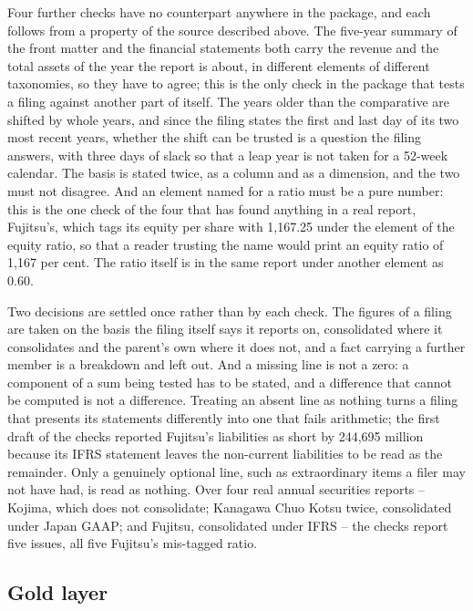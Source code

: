 Four further checks have no counterpart anywhere in the package, and each follows from a property of the source described above. The five-year summary of the front matter and the financial statements both carry the revenue and the total assets of the year the report is about, in different elements of different taxonomies, so they have to agree; this is the only check in the package that tests a filing against another part of itself. The years older than the comparative are shifted by whole years, and since the filing states the first and last day of its two most recent years, whether the shift can be trusted is a question the filing answers, with three days of slack so that a leap year is not taken for a 52-week calendar. The basis is stated twice, as a column and as a dimension, and the two must not disagree. And an element named for a ratio must be a pure number: this is the one check of the four that has found anything in a real report, Fujitsu's, which tags its equity per share with 1,167.25 under the element of the equity ratio, so that a reader trusting the name would print an equity ratio of 1,167 per cent. The ratio itself is in the same report under another element as 0.60.

Two decisions are settled once rather than by each check. The figures of a filing are taken on the basis the filing itself says it reports on, consolidated where it consolidates and the parent's own where it does not, and a fact carrying a further member is a breakdown and left out. And a missing line is not a zero: a component of a sum being tested has to be stated, and a difference that cannot be computed is not a difference. Treating an absent line as nothing turns a filing that presents its statements differently into one that fails arithmetic; the first draft of the checks reported Fujitsu's liabilities as short by 244,695 million because its IFRS statement leaves the non-current liabilities to be read as the remainder. Only a genuinely optional line, such as extraordinary items a filer may not have had, is read as nothing. Over four real annual securities reports -- Kojima, which does not consolidate; Kanagawa Chuo Kotsu twice, consolidated under Japan GAAP; and Fujitsu, consolidated under IFRS -- the checks report five issues, all five Fujitsu's mis-tagged ratio.

\subsection{Gold layer}

